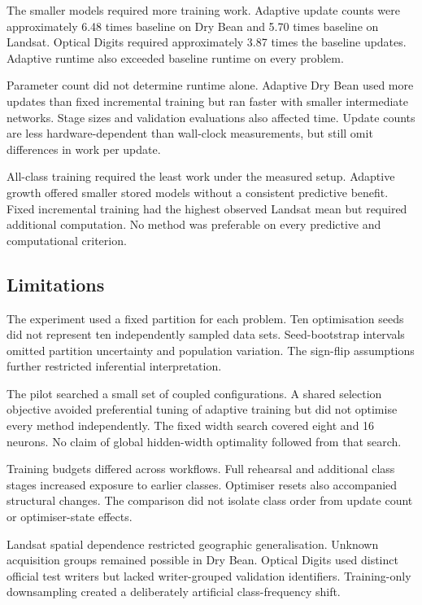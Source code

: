 \documentclass[conference,10pt]{IEEEtran}
\begin{document}
The smaller models required more training work. Adaptive update counts were approximately 6.48 times baseline on Dry Bean and 5.70 times baseline on Landsat. Optical Digits required approximately 3.87 times the baseline updates. Adaptive runtime also exceeded baseline runtime on every problem.

Parameter count did not determine runtime alone. Adaptive Dry Bean used more updates than fixed incremental training but ran faster with smaller intermediate networks. Stage sizes and validation evaluations also affected time. Update counts are less hardware-dependent than wall-clock measurements, but still omit differences in work per update.

All-class training required the least work under the measured setup. Adaptive growth offered smaller stored models without a consistent predictive benefit. Fixed incremental training had the highest observed Landsat mean but required additional computation. No method was preferable on every predictive and computational criterion.

\subsection{Limitations}

The experiment used a fixed partition for each problem. Ten optimisation seeds did not represent ten independently sampled data sets. Seed-bootstrap intervals omitted partition uncertainty and population variation. The sign-flip assumptions further restricted inferential interpretation.

The pilot searched a small set of coupled configurations. A shared selection objective avoided preferential tuning of adaptive training but did not optimise every method independently. The fixed width search covered eight and 16 neurons. No claim of global hidden-width optimality followed from that search.

Training budgets differed across workflows. Full rehearsal and additional class stages increased exposure to earlier classes. Optimiser resets also accompanied structural changes. The comparison did not isolate class order from update count or optimiser-state effects.

Landsat spatial dependence restricted geographic generalisation. Unknown acquisition groups remained possible in Dry Bean. Optical Digits used distinct official test writers but lacked writer-grouped validation identifiers. Training-only downsampling created a deliberately artificial class-frequency shift.
\end{document}
